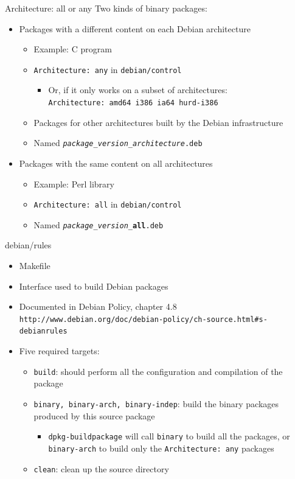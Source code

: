 \documentclass[10pt,final]{beamer}
\begin{document}
\begin{frame}{Architecture: all or any}
Two kinds of binary packages:
\hbr
\begin{itemize}
	\item Packages with a different content on each Debian architecture
	\begin{itemize}
	\item Example: C program
	\item \texttt{Architecture:\ any} in \texttt{debian/control}
		\begin{itemize}
			\item Or, if it only works on a subset of architectures:\\
				\texttt{Architecture:\ amd64 i386 ia64 hurd-i386}
		\end{itemize}
	\item Packages for other architectures built by the Debian infrastructure
	\item Named \texttt{\textsl{package}\_\textsl{version}\_\textsl{architecture}.deb}
	\end{itemize}
\br
	\item Packages with the same content on all architectures
	\begin{itemize}
	\item Example: Perl library
	\item \texttt{Architecture:\ all} in \texttt{debian/control}
	\item Named \texttt{\textsl{package}\_\textsl{version}\_\textbf{all}.deb}
\end{itemize}
\end{itemize}
\end{frame}

\begin{frame}[fragile]{debian/rules}
	\hbr
	\begin{itemize}
		\item Makefile
			\br
		\item Interface used to build Debian packages
			\br
		\item Documented in Debian Policy, chapter 4.8\\
			{\small \texttt{http://www.debian.org/doc/debian-policy/ch-source.html\#s-debianrules}}
			\br
		\item Five required targets:
		\begin{itemize}
			\item \texttt{build}: should perform all the configuration and compilation of the package
				\hbr
			\item \texttt{binary, binary-arch, binary-indep}: build the binary packages produced by this source package
				\begin{itemize}
					\item \texttt{dpkg-buildpackage} will call \texttt{binary} to build all the packages, or \texttt{binary-arch} to build only the \texttt{Architecture:~any} packages
				\end{itemize}
				\hbr
			\item \texttt{clean}: clean up the source directory
		\end{itemize}
	\end{itemize}
\end{frame}
\end{document}

